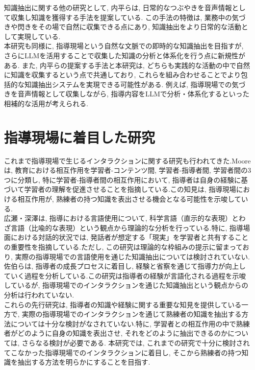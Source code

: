 知識抽出に関する他の研究として, 内平ら\cite{Uchihira2022}は, 日常的なつぶやきを音声情報として収集し知識を獲得する手法を提案している. この手法の特徴は, 業務中の気づきや閃きをその場で自然に収集できる点にあり, 知識抽出をより日常的な活動として実現している. \\

本研究も同様に, 指導現場という自然な文脈での即時的な知識抽出を目指すが, さらにLLMを活用することで収集した知識の分析と体系化を行う点に新規性がある. また, 内平らの提案する手法と本研究は, どちらも実践的な活動の中で自然に知識を収集するという点で共通しており, これらを組み合わせることでより包括的な知識抽出システムを実現できる可能性がある. 例えば, 指導現場での気づきを音声情報として収集しながら, 指導内容をLLMで分析・体系化するといった相補的な活用が考えられる.\\



\section{指導現場に着目した研究}
これまで指導現場で生じるインタラクションに関する研究も行われてきた.Moore\cite{Moore1989}は, 教育における相互作用を学習者-コンテンツ間, 学習者-指導者間, 学習者間の3つに分類し, 特に学習者-指導者間の相互作用において, 指導者は自身の経験に基づいて学習者の理解を促進させることを指摘している.この知見は, 指導現場における相互作用が, 熟練者の持つ知識を表出させる機会となる可能性を示唆している.\\

広瀬・深澤\cite{Hirose2018}は, 指導における言語使用について, 科学言語（直示的な表現）とわざ言語（比喩的な表現）という観点から理論的な分析を行っている.特に, 指導場面における対話的状況では, 発話者が想定する「現実」を学習者と共有することの重要性を指摘している.ただし, この研究は理論的な枠組みの提示に留まっており, 実際の指導現場での言語使用を通じた知識抽出については検討されていない.\\

佐伯ら\cite{Saeki2017}は, 指導者の成長プロセスに着目し, 経験と省察を通じて指導力が向上していく過程を分析している.この研究は指導者の経験が言語化される過程を示唆しているが, 指導現場でのインタラクションを通じた知識抽出という観点からの分析は行われていない.\\

これらの先行研究は, 指導者の知識や経験に関する重要な知見を提供している一方で, 実際の指導現場でのインタラクションを通じて熟練者の知識を抽出する方法については十分な検討がなされていない.特に, 学習者との相互作用の中で熟練者がどのように自身の知識を表出させ, それをどのように抽出できるのかについては, さらなる検討が必要である.
本研究では, これまでの研究で十分に検討されてこなかった指導現場でのインタラクションに着目し, そこから熟練者の持つ知識を抽出する方法を明らかにすることを目指す.\\




